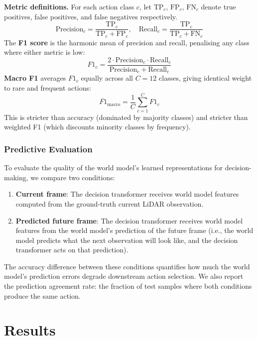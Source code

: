 \documentclass[sensors,article,submit,pdftex,moreauthors]{Definitions/mdpi}
\begin{document}
\textbf{Metric definitions.}
For each action class $c$, let $\text{TP}_c$, $\text{FP}_c$, $\text{FN}_c$ denote true positives, false positives, and false negatives respectively.
\begin{equation}
    \text{Precision}_c = \frac{\text{TP}_c}{\text{TP}_c + \text{FP}_c}, \quad
    \text{Recall}_c    = \frac{\text{TP}_c}{\text{TP}_c + \text{FN}_c}
\end{equation}
The \textbf{F1 score} is the harmonic mean of precision and recall, penalising any class where either metric is low:
\begin{equation}
    F1_c = \frac{2 \cdot \text{Precision}_c \cdot \text{Recall}_c}{\text{Precision}_c + \text{Recall}_c}
\end{equation}
\textbf{Macro F1} averages $F1_c$ equally across all $C{=}12$ classes, giving identical weight to rare and frequent actions:
\begin{equation}
    \overline{F1}_\text{macro} = \frac{1}{C}\sum_{c=1}^{C} F1_c
\end{equation}
This is stricter than accuracy (dominated by majority classes) and stricter than weighted F1 (which discounts minority classes by frequency).

\subsubsection{Predictive Evaluation}
To evaluate the quality of the world model's learned representations for decision-making, we compare two conditions:
\begin{enumerate}
    \item \textbf{Current frame}: The decision transformer receives world model features computed from the ground-truth current LiDAR observation.
    \item \textbf{Predicted future frame}: The decision transformer receives world model features from the world model's prediction of the future frame (i.e., the world model predicts what the next observation will look like, and the decision transformer acts on that prediction).
\end{enumerate}
The accuracy difference between these conditions quantifies how much the world model's prediction errors degrade downstream action selection. We also report the prediction agreement rate: the fraction of test samples where both conditions produce the same action.

\section{Results}
\label{sec:results}
\end{document}
